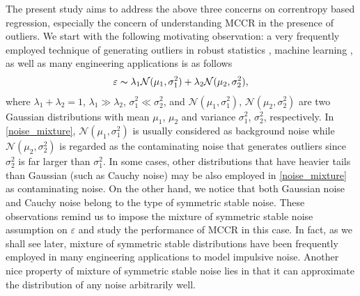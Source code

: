 \documentclass[11pt]{article}
\begin{document}
The present study aims to address the above three concerns on correntropy based regression, especially the concern of understanding MCCR in the presence of outliers. We start with the following motivating observation: a very frequently employed technique of generating outliers in robust statistics \cite{tukey1960survey,huber1964robust,jurevckova2005robust,huber2009robust,hampel2011robust}, machine learning \cite{scholkopf2001learning,han2011data}, as well as many engineering applications \cite{kassam1985robust,kozick2000maximum} is as follows 
\begin{align}\label{noise_mixture}
\varepsilon\thicksim \lambda_1\mathcal{N}(\mu_1,\sigma_1^2)+\lambda_2\mathcal{N}(\mu_2,\sigma_2^2),
\end{align}
where $\lambda_1+\lambda_2=1$, $\lambda_1\gg\lambda_2$, $\sigma_1^2\ll \sigma_2^2$, and $\mathcal{N}(\mu_1,\sigma_1^2)$, $\mathcal{N}(\mu_2,\sigma_2^2)$ are two Gaussian distributions with mean $\mu_1$, $\mu_2$ and variance $\sigma_1^2$, $\sigma_2^2$, respectively. In \eqref{noise_mixture}, $\mathcal{N}(\mu_1,\sigma_1^2)$ is usually considered as background noise while $\mathcal{N}(\mu_2,\sigma_2^2)$ is regarded as the contaminating noise that generates outliers since $\sigma_2^2$ is far larger than $\sigma_1^2$. In some cases, other distributions that have heavier tails than Gaussian (such as Cauchy noise) may be also employed in \eqref{noise_mixture} as contaminating noise. On the other hand, we notice that both Gaussian noise and Cauchy noise belong to the type of symmetric stable noise. These observations remind us to impose the mixture of symmetric stable noise assumption on $\varepsilon$ and study the performance of MCCR in this case. In fact, as we shall see later, mixture of symmetric stable distributions have been frequently employed in many engineering applications to model impulsive noise. Another nice property of mixture of symmetric stable noise lies in that it can approximate the distribution of any noise arbitrarily well. 
\end{document}
